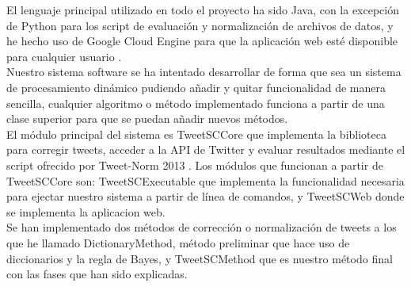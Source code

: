\documentclass[spanish,12pt, a4paper,twoside]{paper}
\begin{document}
El lenguaje principal utilizado en todo el proyecto ha sido Java, con la excepción de Python para los script de evaluación y normalización de archivos de datos, y he hecho uso de Google Cloud Engine \cite{googlecloudengine} para que la aplicación web esté disponible para cualquier usuario \cite{tweetscweb:spellchecker}.\\

Nuestro sistema software se ha intentado desarrollar de forma que sea un sistema de procesamiento dinámico pudiendo añadir y quitar funcionalidad de manera sencilla, cualquier algoritmo o método implementado funciona a partir de una clase superior para que se puedan añadir nuevos métodos.\\

El módulo principal del sistema es TweetSCCore que implementa la biblioteca para corregir tweets, acceder a la API de Twitter y evaluar resultados mediante el script ofrecido por Tweet-Norm 2013 \cite{alegria:2013}. Los módulos que funcionan a partir de TweetSCCore son: TweetSCExecutable que implementa la funcionalidad necesaria para ejectar nuestro sistema a partir de línea de comandos, y TweetSCWeb donde se implementa la aplicacion web.\\

Se han implementado dos métodos de corrección o normalización de tweets a los que he llamado DictionaryMethod, método preliminar que hace uso de diccionarios y la regla de Bayes, y TweetSCMethod que es nuestro método final con las fases que han sido explicadas.
\end{document}
